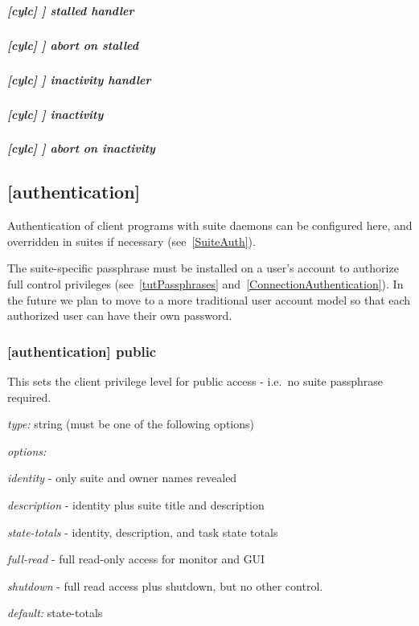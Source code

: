 \subparagraph[stalled handler]{[cylc] \textrightarrow [[events]] \textrightarrow stalled handler}

\subparagraph[abort on stalled]{[cylc] \textrightarrow [[events]] \textrightarrow abort on stalled}

\subparagraph[inactivity handler]{[cylc] \textrightarrow [[events]] \textrightarrow inactivity handler}

\subparagraph[inactivity]{[cylc] \textrightarrow [[events]] \textrightarrow inactivity}

\subparagraph[abort on inactivity]{[cylc] \textrightarrow [[events]] \textrightarrow abort on inactivity}

\subsection{[authentication]}
\label{GlobalAuth}

Authentication of client programs with suite daemons can be configured here, and
overridden in suites if necessary (see~\ref{SuiteAuth}).

The suite-specific passphrase must be installed on a user's account to
authorize full control privileges (see~\ref{tutPassphrases}
and~\ref{ConnectionAuthentication}). In the future we plan to move to a more
traditional user account model so that each authorized user can have their own
password.

\subsubsection[public]{[authentication] \textrightarrow public}

This sets the client privilege level for public access - i.e.\ no suite passphrase
required.

\begin{myitemize}
\item {\em type:} string (must be one of the following options)
\item {\em options:}
    \begin{myitemize}
        \item {\em identity} - only suite and owner names revealed
        \item {\em description} - identity plus suite title and description
        \item {\em state-totals} - identity, description, and task state totals
        \item {\em full-read} - full read-only access for monitor and GUI
        \item {\em shutdown} - full read access plus shutdown, but no other
            control.
    \end{myitemize}
\item {\em default:} state-totals
\end{myitemize}
